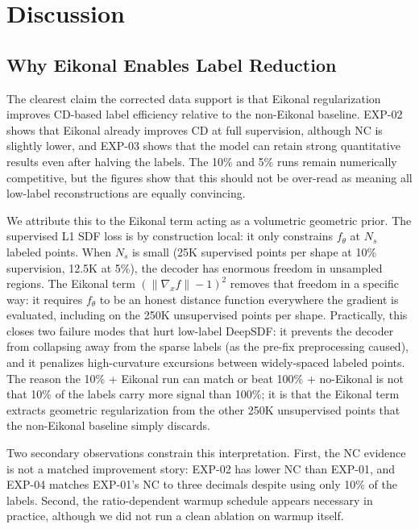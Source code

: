 \documentclass[conference]{IEEEtran}
\begin{document}
\section{Discussion}

\subsection{Why Eikonal Enables Label Reduction}
\label{sec:why_eikonal}

The clearest claim the corrected data support is that Eikonal regularization
improves CD-based label efficiency relative to the non-Eikonal baseline. EXP-02 shows
that Eikonal already improves CD at full supervision, although NC is slightly
lower, and EXP-03 shows that the model can retain strong quantitative results
even after halving the labels. The 10\% and 5\% runs remain numerically competitive, but the figures
show that this should not be over-read as meaning all low-label reconstructions
are equally convincing.

We attribute this to the Eikonal term acting as a volumetric geometric prior. The supervised L1 SDF loss is by construction local: it only constrains $f_\theta$ at $N_s$ labeled points. When $N_s$ is small (25K supervised points per shape at 10\% supervision, 12.5K at 5\%), the decoder has enormous freedom in unsampled regions. The Eikonal term $(\|\nabla_x f\| - 1)^2$ removes that freedom in a specific way: it requires $f_\theta$ to be an honest distance function everywhere the gradient is evaluated, including on the 250K unsupervised points per shape. Practically, this closes two failure modes that hurt low-label DeepSDF: it prevents the decoder from collapsing away from the sparse labels (as the pre-fix preprocessing caused), and it penalizes high-curvature excursions between widely-spaced labeled points. The reason the 10\% + Eikonal run can match or beat 100\% + no-Eikonal is not that 10\% of the labels carry more signal than 100\%; it is that the Eikonal term extracts geometric regularization from the other 250K unsupervised points that the non-Eikonal baseline simply discards.

Two secondary observations constrain this interpretation. First, the NC evidence
is not a matched improvement story: EXP-02 has lower NC than EXP-01, and EXP-04
matches EXP-01's NC to three decimals despite using only 10\% of the labels.
Second, the ratio-dependent warmup schedule appears necessary in practice,
although we did not run a clean ablation on warmup itself.
\end{document}

